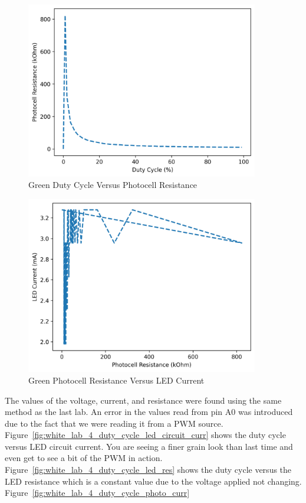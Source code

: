 \documentclass[12pt,titlepage]{article}
\begin{document}
\begin{figure}[!htb]
\centering
\includegraphics[width=4in]{lab_4/green_duty_cycle_photo_res.png}
\caption{Green Duty Cycle Versus Photocell Resistance}
\end{figure}
\begin{figure}[!htb]
  \centering
  \includegraphics[width=4in]{lab_4/green_photo_res_led_curr.png}
  \caption{Green Photocell Resistance Versus LED Current}
\end{figure}
The values of the voltage, current, and resistance were found using the same method as the last lab. An error in the values read from pin A0 was introduced due to
the fact that we were reading it from a PWM source. Figure~\ref{fig:white_lab_4_duty_cycle_led_circuit_curr} shows the
duty cycle versus LED circuit current. You are seeing a finer grain look than last time and even get to see a bit of the PWM in action. Figure~\ref{fig:white_lab_4_duty_cycle_led_res}
shows the duty cycle versus the LED resistance which is a constant value due to the voltage applied not changing. Figure~\ref{fig:white_lab_4_duty_cycle_photo_curr}
\end{document}
